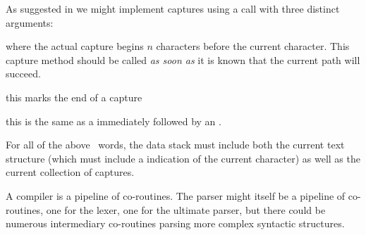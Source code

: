 \item {}

\stopitemize


As suggested in \cite{ierusalimschy2008lpegArticle} we might implement 
captures using a  call with three distinct arguments:

\startitemize[n]

\item {} where the actual capture begins $n$ characters before 
the current character. This capture method should be called \emph{as soon 
as} it is known that the current path will succeed. 

\item {} this marks the end of a capture

\item {} this is the same as a  immediately 
followed by an . 

\stopitemize 

For all of the above \joylol\ words, the data stack must include both the 
current text structure (which must include a indication of the current 
character) as well as the current collection of captures.

A compiler is a pipeline of co-routines. The parser might itself be a 
pipeline of co-routines, one for the lexer, one for the ultimate parser, 
but there could be numerous intermediary co-routines parsing more complex 
syntactic structures. 

